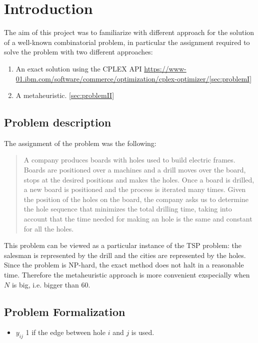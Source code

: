 
\section{Introduction}
The aim of this project was to familiarize with different approach for the solution of a well-known combinatorial problem, in
particular the assignment required to solve the problem with two different approaches:
\begin{enumerate}
	\item An exact solution using the CPLEX API \url{https://www-01.ibm.com/software/commerce/optimization/cplex-optimizer/}\ref{sec:problemI}
	
	\item A metaheuristic. \ref{sec:problemII}
\end{enumerate}
\subsection{Problem description}
The assignment of the problem was the following:
\begin{quote}
	A company produces boards with holes used to build electric frames. Boards are positioned over a 
	machines and a drill moves over the board, stops at the desired positions
	and makes the holes. Once a board is drilled, a new board is positioned and the process is
	iterated many times. Given the position of the holes on the board, the company asks us
	to determine the hole sequence that minimizes the total drilling time, taking into account
	that the time needed for making an hole is the same and constant for all the holes.
\end{quote}
This problem can be viewed as a particular instance of the TSP problem: the salesman is represented by the 
drill and the cities are represented by the holes.
Since the problem is NP-hard, the exact method does not halt in a reasonable time. Therefore the metaheuristic approach is more convenient exspecially when $N$ is big, i.e. bigger than $60$.
 
\subsection{Problem Formalization}
\begin{itemize}
	\item $y_{ij}$ 1 if the edge between hole $i$ and $j$ is used.
\end{itemize}
